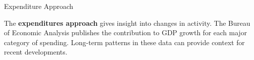 \newpage
\begin{minipage}{0.76\textwidth}   
\normalsize Expenditure Approach
\vspace{-1mm}

\small The \textbf{expenditures approach} gives insight into changes in activity. The Bureau of Economic Analysis publishes the contribution to GDP growth for each major category of spending. Long-term patterns in these data can provide context for recent developments. 




\vspace{1mm}

\vspace{4.2cm}


\end{minipage}

